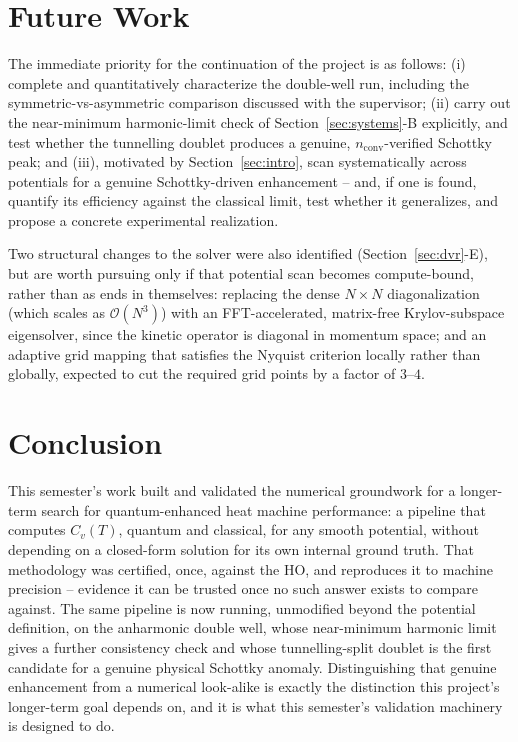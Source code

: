 \documentclass[10pt,conference]{IEEEtran}
\begin{document}
\section{Future Work}
\label{sec:future}
The immediate priority for the continuation of the project is as follows: (i) complete and quantitatively characterize the double-well run, including the symmetric-vs-asymmetric comparison discussed with the supervisor; (ii) carry out the near-minimum harmonic-limit check of Section~\ref{sec:systems}-B explicitly, and test whether the tunnelling doublet produces a genuine, $n_{\text{conv}}$-verified Schottky peak; and (iii), motivated by Section~\ref{sec:intro}, scan systematically across potentials for a genuine Schottky-driven enhancement -- and, if one is found, quantify its efficiency against the classical limit, test whether it generalizes, and propose a concrete experimental realization.

Two structural changes to the solver were also identified (Section~\ref{sec:dvr}-E), but are worth pursuing only if that potential scan becomes compute-bound, rather than as ends in themselves: replacing the dense $N\times N$ diagonalization (which scales as $\mathcal{O}(N^3)$) with an FFT-accelerated, matrix-free Krylov-subspace eigensolver, since the kinetic operator is diagonal in momentum space; and an adaptive grid mapping that satisfies the Nyquist criterion locally rather than globally, expected to cut the required grid points by a factor of $3$--$4$.

\section{Conclusion}
This semester's work built and validated the numerical groundwork for a longer-term search for quantum-enhanced heat machine performance: a pipeline that computes $C_v(T)$, quantum and classical, for any smooth potential, without depending on a closed-form solution for its own internal ground truth. That methodology was certified, once, against the HO, and reproduces it to machine precision -- evidence it can be trusted once no such answer exists to compare against. The same pipeline is now running, unmodified beyond the potential definition, on the anharmonic double well, whose near-minimum harmonic limit gives a further consistency check and whose tunnelling-split doublet is the first candidate for a genuine physical Schottky anomaly. Distinguishing that genuine enhancement from a numerical look-alike is exactly the distinction this project's longer-term goal depends on, and it is what this semester's validation machinery is designed to do.
\end{document}
